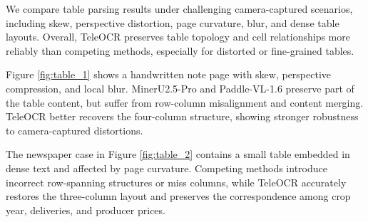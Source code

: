 \documentclass{fairmeta}
\begin{document}
We compare table parsing results under challenging camera-captured scenarios, including skew, perspective distortion, page curvature, blur, and dense table layouts. Overall, TeleOCR preserves table topology and cell relationships more reliably than competing methods, especially for distorted or fine-grained tables.





Figure \ref{fig:table_1} shows a handwritten note page with skew, perspective compression, and local blur. MinerU2.5-Pro and Paddle-VL-1.6 preserve part of the table content, but suffer from row-column misalignment and content merging. TeleOCR better recovers the four-column structure, showing stronger robustness to camera-captured distortions.

The newspaper case in Figure \ref{fig:table_2} contains a small table embedded in dense text and affected by page curvature. Competing methods introduce incorrect row-spanning structures or miss columns, while TeleOCR accurately restores the three-column layout and preserves the correspondence among crop year, deliveries, and producer prices.
\end{document}
